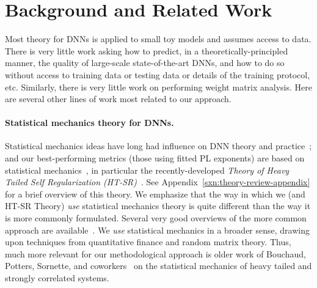 \section{Background and Related Work}
\label{sxn:background}

Most theory for DNNs is applied to small toy models and assumes access to data.
There is very little work asking how to predict, in a theoretically-principled manner, the quality of large-scale state-of-the-art DNNs, and how to do so without access to training data or testing data or details of the training protocol, etc.
Similarly, there is very little work on performing weight matrix analysis.
Here are several other lines of work most related to our approach.


\paragraph{Statistical mechanics theory for DNNs.}

Statistical mechanics ideas have long had influence on DNN theory and practice~\cite{EB01_BOOK, MM17_TR, BKPx20}; and 
our best-performing metrics (those using fitted PL exponents) are based on statistical mechanics~\cite{MM17_TR, MM18_TR, MM19_HTSR_ICML, MM19_KDD, MM20_SDM}, in particular the recently-developed \emph{Theory of Heavy Tailed Self Regularization (HT-SR)}~\cite{MM18_TR, MM19_HTSR_ICML, MM20_SDM}.  
See Appendix~\ref{sxn:theory-review-appendix} for a brief overview of this theory.
We emphasize that the way in which we (and HT-SR Theory) \emph{use} statistical mechanics theory is quite different than the way it is more commonly formulated.
Several very good overviews of the more common approach are available~\cite{EB01_BOOK, BKPx20}.
We \emph{use} statistical mechanics in a broader sense, drawing upon techniques from quantitative finance and random matrix theory.  %
Thus, much more relevant for our methodological approach is older work of Bouchaud, Potters, Sornette, and coworkers~\cite{BouchaudPotters03, SornetteBook, BP11, bun2017} on the statistical mechanics of heavy tailed and strongly correlated systems.


